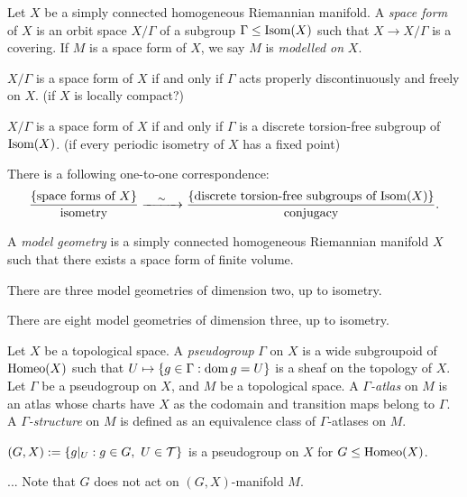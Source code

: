 \documentclass{../../large}
\begin{document}
\begin{prb}
Let $X$ be a simply connected homogeneous Riemannian manifold.
A \emph{space form} of $X$ is an orbit space $X/\Gamma$ of a subgroup $\Gamma\le\operatorname{Isom}(X)$ such that $X\to X/\Gamma$ is a covering.
If $M$ is a space form of $X$, we say $M$ is \emph{modelled on} $X$.
\begin{parts}
\item $X/\Gamma$ is a space form of $X$ if and only if $\Gamma$ acts properly discontinuously and freely on $X$. (if $X$ is locally compact?)
\item $X/\Gamma$ is a space form of $X$ if and only if $\Gamma$ is a discrete torsion-free subgroup of $\operatorname{Isom}(X)$. (if every periodic isometry of $X$ has a fixed point)
\item There is a following one-to-one correspondence:
\[
\frac{\{\text{space forms of $X$}\}}{\text{isometry}}
\xrightarrow{\quad\sim\quad}
\frac{\{\text{discrete torsion-free subgroups of $\operatorname{Isom}(X)$}\}}{\text{conjugacy}}.
\]
\end{parts}
\end{prb}
\begin{pf}

\end{pf}


\begin{prb}
A \emph{model geometry} is a simply connected homogeneous Riemannian manifold $X$ such that there exists a space form of finite volume.
\begin{parts}
\item There are three model geometries of dimension two, up to isometry.
\item There are eight model geometries of dimension three, up to isometry.
\end{parts}
\end{prb}
\begin{pf}

\end{pf}



\begin{prb}[$(G,X)$-manifolds]
Let $X$ be a topological space.
A \emph{pseudogroup} $\Gamma$ on $X$ is a wide subgroupoid of $\operatorname{Homeo}(X)$ such that $U\mapsto\{g\in\Gamma:\operatorname{dom} g=U\}$ is a sheaf on the topology of $X$.
Let $\Gamma$ be a pseudogroup on $X$, and $M$ be a topological space.
A \emph{$\Gamma$-atlas} on $M$ is an atlas whose charts have $X$ as the codomain and transition maps belong to $\Gamma$.
A \emph{$\Gamma$-structure} on $M$ is defined as an equivalence class of $\Gamma$-atlases on $M$.
\begin{parts}
\item $(G,X):=\{g|_U:g\in G,\ U\in\mathcal{T}\}$ is a pseudogroup on $X$ for $G\le\operatorname{Homeo}(X)$.
\item...
Note that $G$ does not act on $(G,X)$-manifold $M$.
\end{parts}
\end{prb}
\end{document}
